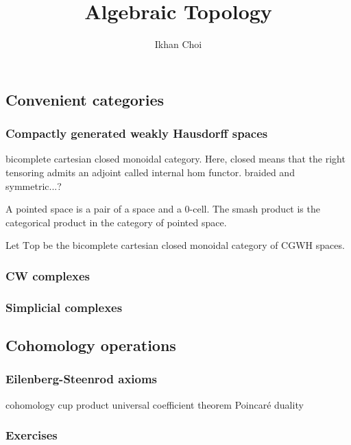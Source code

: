 \documentclass{../../large}
\begin{document}
\title{Algebraic Topology}
\author{Ikhan Choi}
\maketitle
\tableofcontents


\part{}

\chapter{Convenient categories}
\section{Compactly generated weakly Hausdorff spaces}
bicomplete cartesian closed monoidal category.
Here, closed means that the right tensoring admits an adjoint called internal hom functor.
braided and symmetric...?


A pointed space is a pair of a space and a 0-cell.
The smash product is the categorical product in the category of pointed space.


Let $\mathrm{Top}$ be the bicomplete cartesian closed monoidal category of CGWH spaces.
\section{CW complexes}



\section{Simplicial complexes}






\chapter{Cohomology operations}
\section{Eilenberg-Steenrod axioms}
cohomology
cup product
universal coefficient theorem
Poincar\'e duality






\section*{Exercises}
\end{document}
